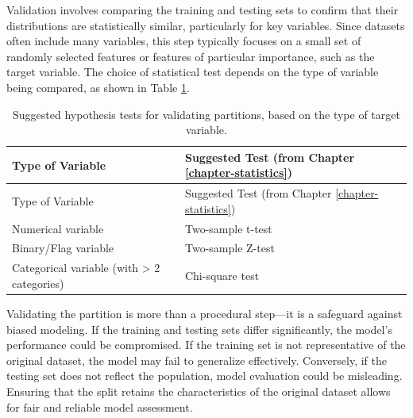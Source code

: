 \documentclass[
  11pt,
]{book}
\theoremstyle{definition}
\theoremstyle{definition}
\theoremstyle{definition}
\theoremstyle{definition}
\theoremstyle{remark}
\begin{document}
Validation involves comparing the training and testing sets to confirm that their distributions are statistically similar, particularly for key variables. Since datasets often include many variables, this step typically focuses on a small set of randomly selected features or features of particular importance, such as the target variable. The choice of statistical test depends on the type of variable being compared, as shown in Table \ref{tab:partition-test}.

\begin{longtable}[]{@{}
  >{\raggedright\arraybackslash}p{}
  >{\raggedright\arraybackslash}p{}@{}}
\caption{\label{tab:partition-test} Suggested hypothesis tests for validating partitions, based on the type of target variable.}\tabularnewline
\toprule\noalign{}
\begin{minipage}[b]{\linewidth}\raggedright
Type of Variable
\end{minipage} & \begin{minipage}[b]{\linewidth}\raggedright
Suggested Test (from Chapter \ref{chapter-statistics})
\end{minipage} \\
\midrule\noalign{}
\endfirsthead
\toprule\noalign{}
\begin{minipage}[b]{\linewidth}\raggedright
Type of Variable
\end{minipage} & \begin{minipage}[b]{\linewidth}\raggedright
Suggested Test (from Chapter \ref{chapter-statistics})
\end{minipage} \\
\midrule\noalign{}
\endhead
\bottomrule\noalign{}
\endlastfoot
Numerical variable & Two-sample t-test \\
Binary/Flag variable & Two-sample Z-test \\
Categorical variable (with \textgreater{} 2 categories) & Chi-square test \\
\end{longtable}

Validating the partition is more than a procedural step---it is a safeguard against biased modeling. If the training and testing sets differ significantly, the model's performance could be compromised. If the training set is not representative of the original dataset, the model may fail to generalize effectively. Conversely, if the testing set does not reflect the population, model evaluation could be misleading. Ensuring that the split retains the characteristics of the original dataset allows for fair and reliable model assessment.
\end{document}

